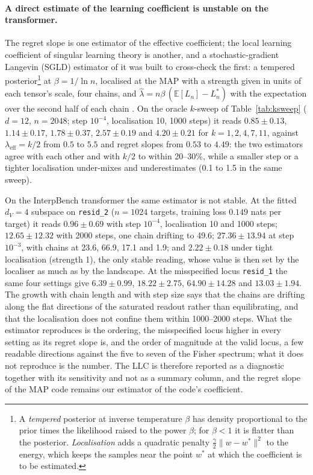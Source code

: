 \documentclass[11pt,a4paper]{article}
\newcommand{\dv}{d_V}
\begin{document}
\paragraph{A direct estimate of the learning coefficient is unstable on the transformer.} The regret slope is one estimator of the effective coefficient; the local learning coefficient of singular learning theory is another, and a stochastic-gradient Langevin (SGLD) estimator of it was built to cross-check the first: a tempered posterior\footnote{A \emph{tempered} posterior at inverse temperature $\beta$ has density proportional to the prior times the likelihood raised to the power $\beta$; for $\beta<1$ it is flatter than the posterior. \emph{Localisation} adds a quadratic penalty $\tfrac{\gamma}{2}\|w-w^*\|^2$ to the energy, which keeps the samples near the point $w^*$ at which the coefficient is to be estimated.} at $\beta=1/\ln n$, localised at the MAP with a strength given in units of each tensor's scale, four chains, and $\hat\lambda=n\beta\,(\mathbb{E}[L_n]-L_n^*)$ with the expectation over the second half of each chain \cite{lau2025llc}. On the oracle $k$-sweep of Table~\ref{tab:ksweep} ($d=12$, $n=2048$; step $10^{-4}$, localisation 10, 1000 steps) it reads $0.85\pm0.13$, $1.14\pm0.17$, $1.78\pm0.37$, $2.57\pm0.19$ and $4.20\pm0.21$ for $k=1,2,4,7,11$, against $\lambda_{\mathrm{eff}}=k/2$ from $0.5$ to $5.5$ and regret slopes from $0.53$ to $4.49$: the two estimators agree with each other and with $k/2$ to within 20--30\%, while a smaller step or a tighter localisation under-mixes and underestimates (0.1 to 1.5 in the same sweep).

On the InterpBench transformer the same estimator is not stable. At the fitted $\dv=4$ subspace on \texttt{resid\_2} ($n=1024$ targets, training loss $0.149$ nats per target) it reads $0.96\pm0.69$ with step $10^{-4}$, localisation 10 and 1000 steps; $12.65\pm12.32$ with 2000 steps, one chain drifting to 49.6; $27.36\pm13.94$ at step $10^{-3}$, with chains at 23.6, 66.9, 17.1 and 1.9; and $2.22\pm0.18$ under tight localisation (strength 1), the only stable reading, whose value is then set by the localiser as much as by the landscape. At the misspecified locus \texttt{resid\_1} the same four settings give $6.39\pm0.99$, $18.22\pm2.75$, $64.90\pm14.28$ and $13.03\pm1.94$. The growth with chain length and with step size says that the chains are drifting along the flat directions of the saturated readout rather than equilibrating, and that the localisation does not confine them within 1000--2000 steps. What the estimator reproduces is the ordering, the misspecified locus higher in every setting as its regret slope is, and the order of magnitude at the valid locus, a few readable directions against the five to seven of the Fisher spectrum; what it does not reproduce is the number. The LLC is therefore reported as a diagnostic together with its sensitivity and not as a summary column, and the regret slope of the MAP code remains our estimator of the code's coefficient.
\end{document}
